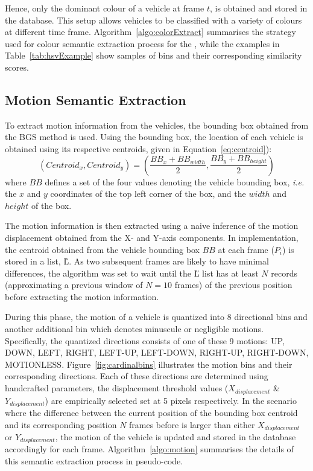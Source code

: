 Hence, only the dominant colour of a vehicle at frame $t$, is obtained and stored in the database. This setup allows vehicles to be classified with a variety of colours at different time frame.
Algorithm~\ref{algo:colorExtract} summarises the strategy used for colour semantic extraction process for the \versionOneExt,
while the examples in Table~\ref{tab:hsvExample} show samples of bins and their corresponding similarity scores.

\vspace{1em}
\subsection{Motion Semantic Extraction}
\label{subsec:motions9binextract}

To extract motion information from the vehicles, the bounding box obtained from the BGS method is used.
Using the bounding box, the location of each vehicle is obtained using its respective centroids, given in Equation~\ref{eq:centroid}):
\begin{equation}
\label{eq:centroid}
(Centroid_x, Centroid_y) = (\frac{BB_{x}+BB_{width}}{2} , \frac{BB_{y}+BB_{height}}{2})
\end{equation}
where $BB$ defines a set of the four values denoting the vehicle bounding box, \emph{i.e.} the $x$ and $y$ coordinates of the top left corner of the box, and the $width$ and $height$ of the box.

The motion information is then extracted using a naive inference of the motion displacement obtained from the X- and Y-axis components. In implementation, the centroid obtained from the vehicle bounding box $BB$ at each frame ($P_i$) is stored in a list, \H{L}.
As two subsequent frames are likely to have minimal differences, the algorithm was set to wait until the \H{L} list has at least $N$ records (approximating a previous window of $N=10$ frames) of the previous position before extracting the motion information.

During this phase, the motion of a vehicle is quantized into 8 directional bins and another additional bin which denotes minuscule or negligible motions.
Specifically, the quantized directions consists of one of these 9 motions: UP, DOWN, LEFT, RIGHT, LEFT-UP, LEFT-DOWN, RIGHT-UP, RIGHT-DOWN, MOTIONLESS.
Figure~\ref{fig:cardinalbins} illustrates the motion bins and their corresponding directions.
Each of these directions are determined using handcrafted parameters, the displacement threshold values ($X_{displacement}$ \& $Y_{displacement}$) are empirically selected set at 5 pixels respectively.
In the scenario where the difference between the current position of the bounding box centroid and its corresponding position $N$ frames before is larger than either $X_{displacement}$ or $Y_{displacement}$, the motion of the vehicle is updated and stored in the database accordingly for each frame. Algorithm~\ref{algo:motion} summarises the details of this semantic extraction process in pseudo-code.

